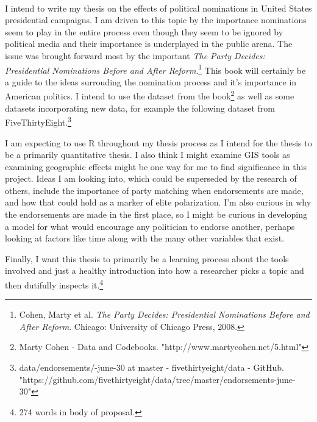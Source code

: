 \documentclass[12pt]{article}
\begin{document}
	
	
	
	
 \\

    
\bigskip \thispagestyle{empty}



\justify \onehalfspacing

I intend to write my thesis on the effects of political nominations in United States presidential campaigns. I am driven to this topic by the importance nominations seem to play in the entire process even though they seem to be ignored by political media and their importance is underplayed in the public arena. The issue was brought forward most by the important \emph{The Party Decides: Presidential Nominations Before and After Reform}.\footnote{Cohen, Marty et al. \emph{The Party Decides: Presidential Nominations Before and After Reform}. Chicago: University of Chicago Press, 2008.} This book will certainly be a guide to the ideas surrouding the nomination process and it's importance in American politics. I intend to use the dataset from the book\footnote{Marty Cohen - Data and Codebooks. "http://www.martycohen.net/5.html"} as well as some datasets incorporating new data, for example the following dataset from FiveThirtyEight.\footnote{data/endorsements/-june-30 at master - fivethirtyeight/data - GitHub. \\ "https://github.com/fivethirtyeight/data/tree/master/endorsements-june-30"}

I am expecting to use R throughout my thesis process as I intend for the thesis to be a primarily quantitative thesis. I also think I might examine GIS tools as examining geographic effects might be one way for me to find significance in this project. Ideas I am looking into, which could be superseded by the research of others, include the importance of party matching when endorsements are made, and how that could hold as a marker of elite polarization. I'm also curious in why the endorsements are made in the first place, so I might be curious in developing a model for what would encourage any politician to endorse another, perhaps looking at factors like time along with the many other variables that exist.

Finally, I want this thesis to primarily be a learning process about the tools involved and just a healthy introduction into how a researcher picks a topic and then dutifully inspects it.\footnote{274 words in body of proposal.}
\end{document}
